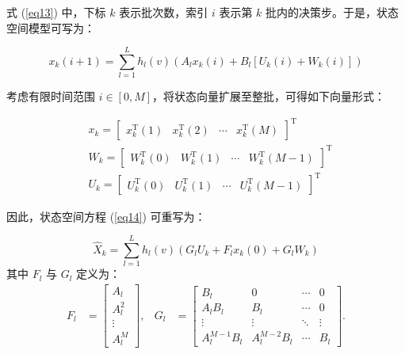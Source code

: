 式 (\ref{eq13}) 中，下标 $k$ 表示批次数，索引 $i$ 表示第 $k$ 批内的决策步。于是，状态空间模型可写为：

\begin{equation}
x_k(i+1) = \sum_{l=1}^{L} h_l(v) \left( A_l x_k(i) + B_l [U_k(i) + W_k(i) ]\right)
\label{eq14}
\end{equation}

考虑有限时间范围 $i \in [0, M]$，将状态向量扩展至整批，可得如下向量形式：

\begin{equation}
\begin{aligned}
& x_k =\left[\begin{array}{llll}
x_k^{\mathrm{T}}(1) & x_k^{\mathrm{T}}(2) & \cdots & x_k^{\mathrm{T}}(M)
\end{array}\right]^{\mathrm{T}} \\
& W_k =\left[\begin{array}{llll}
W_k^{\mathrm{T}}(0) & W_k^{\mathrm{T}}(1) & \cdots & W_k^{\mathrm{T}}(M-1)
\end{array}\right]^{\mathrm{T}} \\
& U_k =\left[\begin{array}{llll}
U_k^{\mathrm{T}}(0) & U_k^{\mathrm{T}}(1) & \cdots & U_k^{\mathrm{T}}(M-1)
\end{array}\right]^{\mathrm{T}}
\end{aligned}
\label{eq15}
\end{equation}

因此，状态空间方程 (\ref{eq14}) 可重写为：

\begin{equation}
\hat{X}_k=\sum_{l=1}^{L} h_l(v) \left( G_l U_k + F_l x_k(0) + G_l W_k \right)
\label{eq16}
\end{equation}
其中 $F_l$ 与 $G_l$ 定义为：
\begin{equation*}
\begin{aligned}
F_l &= 
\begin{bmatrix}
A_l \\
A_l^2 \\
\vdots \\
A_l^M
\end{bmatrix},
& 
G_l &= 
\begin{bmatrix}
B_l & 0 & \cdots & 0 \\
A_l B_l & B_l & \cdots & 0 \\
\vdots & \vdots & \ddots & \vdots \\
A_l^{M-1} B_l & A_l^{M-2} B_l & \cdots & B_l
\end{bmatrix}.
\end{aligned}
\end{equation*}

